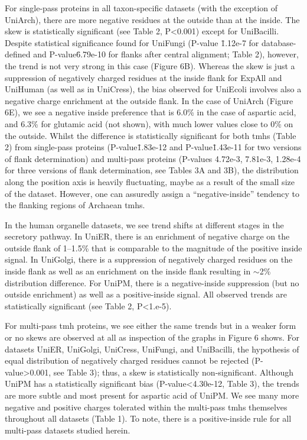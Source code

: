 For single-pass proteins in all taxon-specific datasets (with the exception of UniArch), there are more negative residues at the outside than at the inside. The skew is statistically significant (see Table 2, P<0.001) except for UniBacilli. Despite statistical significance found for UniFungi (P-value \= 1.12e-7 for database-defined and P-value\=6.79e-10 for flanks after central alignment; Table 2), however, the trend is not very strong in this case (Figure 6B). Whereas the skew is just a suppression of negatively charged residues at the inside flank for ExpAll and UniHuman (as well as in UniCress), the bias observed for UniEcoli involves also a negative charge enrichment at the outside flank. In the case of UniArch (Figure 6E), we see a negative inside preference that is 6.0\% in the case of aspartic acid, and 6.3\% for glutamic acid (not shown), with much lower values close to 0\% on the outside. Whilst the difference is statistically significant for both \gls{tmh}s (Table 2) from single-pass proteins (P-value\=1.83e-12 and P-value\=1.43e-11 for two versions of flank determination) and multi-pass proteins (P-values 4.72e-3, 7.81e-3, 1.28e-4 for three versions of flank determination, see Tables 3A and 3B), the distribution along the position axis is heavily fluctuating, maybe as a result of the small size of the dataset. However, one can assuredly assign a “negative-inside” tendency to the flanking regions of Archaean \gls{tmh}s.

In the human organelle datasets, we see trend shifts at different stages in the secretory pathway. In UniER, there is an enrichment of negative charge on the outside flank of 1--1.5\% that is comparable to the magnitude of the positive inside signal. In UniGolgi, there is a suppression of negatively charged residues on the inside flank as well as an enrichment on the inside flank resulting in \(\sim\)2\% distribution difference. For UniPM, there is a negative-inside suppression (but no outside enrichment) as well as a positive-inside signal. All observed trends are statistically significant (see Table 2, P<1.e-5).

For multi-pass \gls{tmh} proteins, we see either the same trends but in a weaker form or no skews are observed at all as inspection of the graphs in Figure 6 shows. For datasets UniER, UniGolgi, UniCress, UniFungi, and UniBacilli, the hypothesis of equal distribution of negatively charged residues cannot be rejected (P-value>0.001, see Table 3); thus, a skew is statistically non-significant. Although UniPM has a statistically significant bias (P-value<4.30e-12, Table 3), the trends are more subtle and most present for aspartic acid of UniPM\@. We see many more negative and positive charges tolerated within the multi-pass \gls{tmh}s themselves throughout all datasets (Table 1). To note, there is a positive-inside rule for all multi-pass datasets studied herein.

